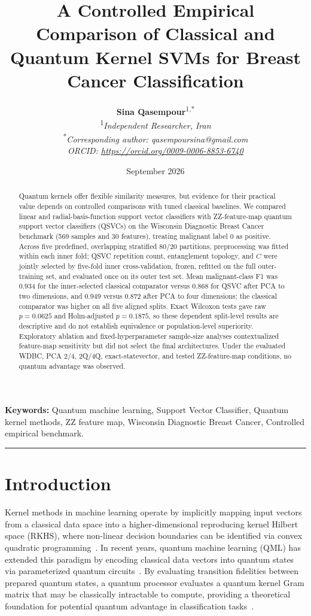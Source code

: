 \documentclass[12pt,a4paper]{article}
\title{\textbf{A Controlled Empirical Comparison of Classical and Quantum Kernel SVMs for Breast Cancer Classification}}
\author{
  \textbf{Sina Qasempour}\textsuperscript{1,*}\\[1ex]
  \textsuperscript{1}\textit{Independent Researcher, Iran}\\
  \textsuperscript{*}\textit{Corresponding author: qasempoursina@gmail.com}\\
  \textit{ORCID: \url{https://orcid.org/0009-0006-8853-6740}}
}
\date{September 2026}
\begin{document}
\maketitle

\begin{abstract}
Quantum kernels offer flexible similarity measures, but evidence for their practical value depends on controlled comparisons with tuned classical baselines. We compared linear and radial-basis-function support vector classifiers with ZZ-feature-map quantum support vector classifiers (QSVCs) on the Wisconsin Diagnostic Breast Cancer benchmark (569 samples and 30 features), treating malignant label 0 as positive. Across five predefined, overlapping stratified 80/20 partitions, preprocessing was fitted within each inner fold; QSVC repetition count, entanglement topology, and $C$ were jointly selected by five-fold inner cross-validation, frozen, refitted on the full outer-training set, and evaluated once on its outer test set. Mean malignant-class F1 was 0.934 for the inner-selected classical comparator versus 0.868 for QSVC after PCA to two dimensions, and 0.949 versus 0.872 after PCA to four dimensions; the classical comparator was higher on all five aligned splits. Exact Wilcoxon tests gave raw $p=0.0625$ and Holm-adjusted $p=0.1875$, so these dependent split-level results are descriptive and do not establish equivalence or population-level superiority. Exploratory ablation and fixed-hyperparameter sample-size analyses contextualized feature-map sensitivity but did not select the final architectures. Under the evaluated WDBC, PCA 2/4, 2Q/4Q, exact-statevector, and tested ZZ-feature-map conditions, no quantum advantage was observed.
\end{abstract}

\noindent\textbf{Keywords:} Quantum machine learning, Support Vector Classifier, Quantum kernel methods, ZZ feature map, Wisconsin Diagnostic Breast Cancer, Controlled empirical benchmark.

\bigskip
\hrule
\bigskip

\section{Introduction}

Kernel methods in machine learning operate by implicitly mapping input vectors from a classical data space into a higher-dimensional reproducing kernel Hilbert space (RKHS), where non-linear decision boundaries can be identified via convex quadratic programming~\cite{cortes1995support, scholkopf2002learning}. In recent years, quantum machine learning (QML) has extended this paradigm by encoding classical data vectors into quantum states via parameterized quantum circuits~\cite{havlicek2019supervised, schuld2019quantum}. By evaluating transition fidelities between prepared quantum states, a quantum processor evaluates a quantum kernel Gram matrix that may be classically intractable to compute, providing a theoretical foundation for potential quantum advantage in classification tasks~\cite{huang2021power, schuld2021supervised, liu2021rigorous}.
\end{document}
